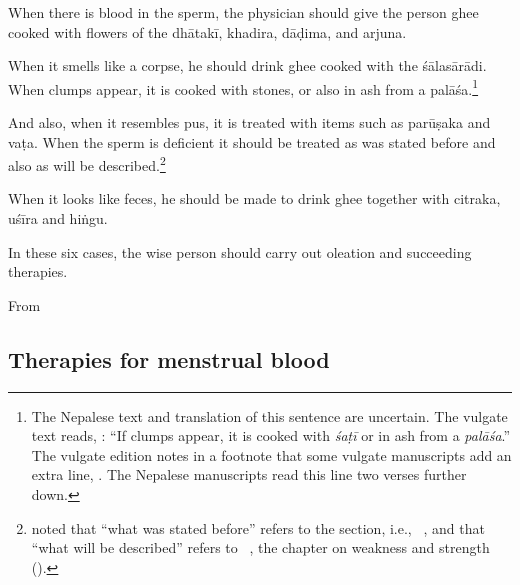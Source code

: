 \begin{translation}
 \begin{sloka}
     When there is blood in the sperm, the physician should give the person ghee 
 cooked with 
 flowers of the \gls{dhātakī},
 \gls{khadira},
 \gls{dāḍima},
 and \gls{arjuna}.
 \end{sloka}
 
 \item [3.2.8]
 
\begin{sloka}
     When it smells like a corpse, he should drink ghee cooked with the
\gls{śālasārādi}. %
\dag When clumps appear, it is cooked with stones, or also in ash from a
\gls{palāśa}.\footnote{The Nepalese text and translation of this sentence
    are uncertain. The vulgate text reads, :  “If clumps appear, it is cooked with
    \emph{śaṭī} or in ash from a \emph{palāśa}.”  The vulgate edition notes in a 
    footnote that some vulgate manuscripts add an extra line, . The Nepalese manuscripts read this line two verses 
    further 
    down.}


 

 \item[9]
 
And also, when it resembles pus, it is treated with items such as
\gls{parūṣaka} and \gls{vaṭa}.  When the sperm is deficient it should be
treated as was stated before and also as will be
described.\footnote{ noted that “what was stated
    before” refers to the  section, i.e., \SS\
    , and that “what will be described” refers to \SS\
    , the chapter on weakness and strength
    (\dev{kṣīṇabalīya}).}
 
 \item [10]
 
 When it looks like feces, he should be made to drink ghee together with
\gls{citraka}, \gls{uśīra} and \gls{hiṅgu}.
 
\item[10a] In these six cases, the wise person should carry out 
oleation and succeeding therapies.

\end{sloka} 

\item[10aa]

From

\subsection{Therapies for menstrual blood}


\end{translation}
